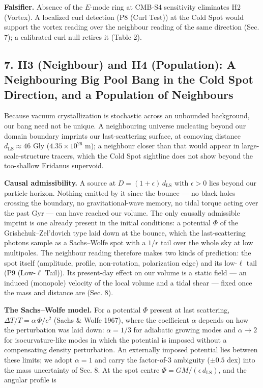 \documentclass[
]{article}
\begin{document}
\textbf{Falsifier.} Absence of the \(E\)-mode ring at CMB-S4 sensitivity
eliminates H2 (Vortex). A localized curl detection (P8 (Curl Test)) at
the Cold Spot would support the vortex reading over the neighbour
reading of the same direction (Sec. 7); a calibrated curl null retires
it (Table 2).

\hypertarget{h3-neighbour-and-h4-population-a-neighbouring-big-pool-bang-in-the-cold-spot-direction-and-a-population-of-neighbours}{%
\subsection{\texorpdfstring{\textbf{7. H3 (Neighbour) and H4
(Population): A Neighbouring Big Pool Bang in the Cold Spot Direction,
and a Population of
Neighbours}}{7. H3 (Neighbour) and H4 (Population): A Neighbouring Big Pool Bang in the Cold Spot Direction, and a Population of Neighbours}}\label{h3-neighbour-and-h4-population-a-neighbouring-big-pool-bang-in-the-cold-spot-direction-and-a-population-of-neighbours}}

Because vacuum crystallization is stochastic across an unbounded
background, our bang need not be unique. A neighbouring universe
nucleating beyond our domain boundary imprints our last-scattering
surface, at comoving distance \(d_{\text{LS}} \approx 46\) Gly
(\(4.35\times10^{26}\) m); a neighbour closer than that would appear in
large-scale-structure tracers, which the Cold Spot sightline does not
show beyond the too-shallow Eridanus supervoid.

\textbf{Causal admissibility.} A source at
\(D = (1+\epsilon)\,d_{\text{LS}}\) with \(\epsilon > 0\) lies beyond
our particle horizon. Nothing emitted by it since the bounce --- no
black holes crossing the boundary, no gravitational-wave memory, no
tidal torque acting over the past Gyr --- can have reached our volume.
The only causally admissible imprint is one already present in the
initial conditions: a potential \(\Phi\) of the Grishchuk--Zel'dovich
type laid down at the bounce, which the last-scattering photons sample
as a Sachs--Wolfe spot with a \(1/r\) tail over the whole sky at low
multipoles. The neighbour reading therefore makes two kinds of
prediction: the spot itself (amplitude, profile, non-rotation,
polarization edge) and its low-\(\ell\) tail (P9 (Low-\(\ell\) Tail)).
Its present-day effect on our volume is a static field --- an induced
(monopole) velocity of the local volume and a tidal shear --- fixed once
the mass and distance are (Sec. 8).

\textbf{The Sachs--Wolfe model.} For a potential \(\Phi\) present at
last scattering, \(\Delta T/T = \alpha\,\Phi/c^2\) (Sachs \& Wolfe
1967), where the coefficient \(\alpha\) depends on how the perturbation
was laid down: \(\alpha = 1/3\) for adiabatic growing modes and
\(\alpha \to 2\) for isocurvature-like modes in which the potential is
imposed without a compensating density perturbation. An externally
imposed potential lies between these limits; we adopt \(\alpha = 1\) and
carry the factor-of-\(3\) ambiguity (\(\pm 0.5\) dex) into the mass
uncertainty of Sec. 8. At the spot centre
\(\Phi = GM/(\epsilon\,d_{\text{LS}})\), and the angular profile is
\end{document}

